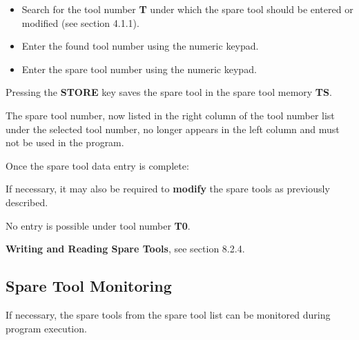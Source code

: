 \vspace{.5cm}

\begin{itemize}
    \item Search for the tool number \textbf{T} under which the spare tool should be entered or modified (see section 4.1.1).
    \item Enter the found tool number using the numeric keypad.
    \vspace{.6cm}
    \item Enter the spare tool number using the numeric keypad.
    \vspace{.6cm}
\end{itemize}

\vspace{.5cm}
Pressing the \textbf{STORE} key saves the spare tool in the spare tool memory \textbf{TS}.

The spare tool number, now listed in the right column of the tool number list under the selected tool number, no longer appears in the left column and must not be used in the program.

Once the spare tool data entry is complete:

\begin{itemize}
\end{itemize}

\vspace{.5cm}
\notes

If necessary, it may also be required to \textbf{modify} the spare tools as previously described.

No entry is possible under tool number \textbf{T0}.

\textbf{Writing and Reading Spare Tools}, see section 8.2.4.

\subsection{Spare Tool Monitoring}

If necessary, the spare tools from the spare tool list can be monitored during program execution.

\begin{itemize}
\end{itemize}

